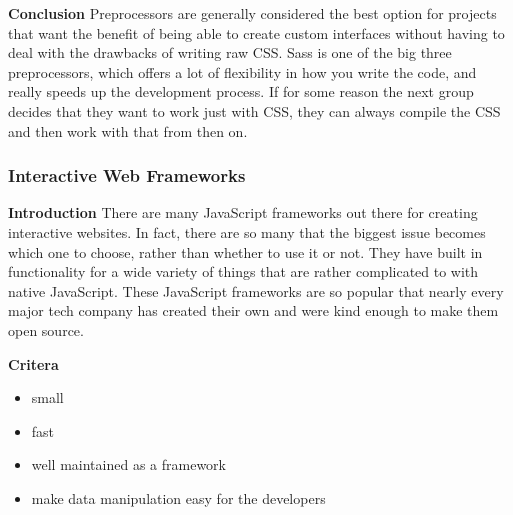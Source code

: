 \documentclass[draftclsnofoot,onecolumn,letterpaper,10pt]{IEEEtran}
\begin{document}
		\textbf{Conclusion}
		Preprocessors are generally considered the best option for projects that want the benefit of being able to create custom interfaces without having to deal with the drawbacks of writing raw CSS.
		Sass is one of the big three preprocessors, which offers a lot of flexibility in how you write the code, and really speeds up the development process.
		If for some reason the next group decides that they want to work just with CSS, they can always compile the CSS and then work with that from then on.\\



\subsubsection{Interactive Web Frameworks}

	\textbf{Introduction}
	There are many JavaScript frameworks out there for creating interactive websites.
	In fact, there are so many that the biggest issue becomes which one to choose, rather than whether to use it or not.
	They have built in functionality for a wide variety of things that are rather complicated to with native JavaScript.
	These JavaScript frameworks are so popular that nearly every major tech company has created their own and were kind enough to make them open source.

	\textbf{Critera}
	\begin{itemize}
		\item small
		\item fast
		\item well maintained as a framework
		\item make data manipulation easy for the developers
	\end{itemize}
\end{document}
